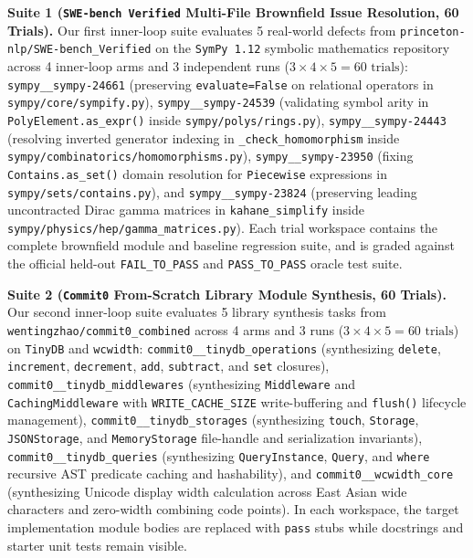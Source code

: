 \documentclass[11pt,a4paper,copyright]{google}
\begin{document}
\textbf{Suite 1 (\texttt{SWE-bench Verified} Multi-File Brownfield Issue Resolution, 60 Trials).} Our first inner-loop suite evaluates 5 real-world defects from \texttt{princeton-nlp/\allowbreak SWE-bench\_\allowbreak Verified} \cite{jimenez2024swebench} on the \texttt{SymPy 1.12} symbolic mathematics repository across 4 inner-loop arms and 3 independent runs ($3 \times 4 \times 5 = 60\text{ trials}$): \texttt{sympy\_\_sympy-24661} (preserving \texttt{evaluate=False} on relational operators in \texttt{sympy/core/\allowbreak sympify.py}), \texttt{sympy\_\_sympy-24539} (validating symbol arity in \texttt{PolyElement.as\_expr()} inside \texttt{sympy/polys/\allowbreak rings.py}), \texttt{sympy\_\_sympy-24443} (resolving inverted generator indexing in \texttt{\_check\_\allowbreak homomorphism} inside \texttt{sympy/\allowbreak combinatorics/\allowbreak homomorphisms.py}), \texttt{sympy\_\_sympy-23950} (fixing \texttt{Contains.as\_set()} domain resolution for \texttt{Piecewise} expressions in \texttt{sympy/sets/\allowbreak contains.py}), and \texttt{sympy\_\_sympy-23824} (preserving leading uncontracted Dirac gamma matrices in \texttt{kahane\_simplify} inside \texttt{sympy/\allowbreak physics/hep/\allowbreak gamma\_matrices.py}). Each trial workspace contains the complete brownfield module and baseline regression suite, and is graded against the official held-out \texttt{FAIL\_TO\_PASS} and \texttt{PASS\_TO\_PASS} oracle test suite.

\textbf{Suite 2 (\texttt{Commit0} From-Scratch Library Module Synthesis, 60 Trials).} Our second inner-loop suite evaluates 5 library synthesis tasks from \texttt{wentingzhao/\allowbreak commit0\_\allowbreak combined} \cite{zhao2024commit0} across 4 arms and 3 runs ($3 \times 4 \times 5 = 60\text{ trials}$) on \texttt{TinyDB} and \texttt{wcwidth}: \texttt{commit0\_\_\allowbreak tinydb\_\allowbreak operations} (synthesizing \texttt{delete}, \texttt{increment}, \texttt{decrement}, \texttt{add}, \texttt{subtract}, and \texttt{set} closures), \texttt{commit0\_\_\allowbreak tinydb\_\allowbreak middlewares} (synthesizing \texttt{Middleware} and \texttt{CachingMiddleware} with \texttt{WRITE\_CACHE\_SIZE} write-buffering and \texttt{flush()} lifecycle management), \texttt{commit0\_\_\allowbreak tinydb\_\allowbreak storages} (synthesizing \texttt{touch}, \texttt{Storage}, \texttt{JSONStorage}, and \texttt{MemoryStorage} file-handle and serialization invariants), \texttt{commit0\_\_\allowbreak tinydb\_\allowbreak queries} (synthesizing \texttt{QueryInstance}, \texttt{Query}, and \texttt{where} recursive AST predicate caching and hashability), and \texttt{commit0\_\_\allowbreak wcwidth\_core} (synthesizing Unicode display width calculation across East Asian wide characters and zero-width combining code points). In each workspace, the target implementation module bodies are replaced with \texttt{pass} stubs while docstrings and starter unit tests remain visible.
\end{document}
